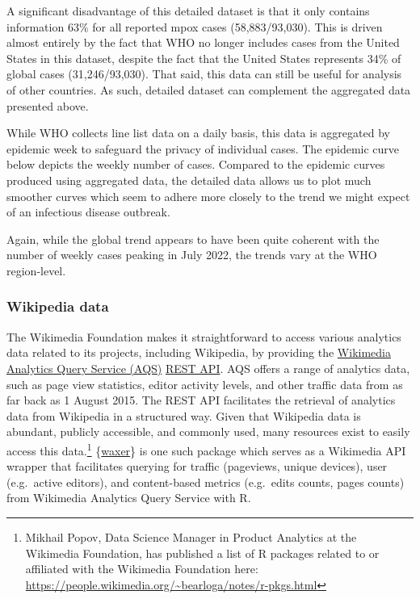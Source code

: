 \documentclass[
  12pt,
]{article}
\begin{document}
A significant disadvantage of this detailed dataset is that it only
contains information 63\% for all reported mpox cases (58,883/93,030).
This is driven almost entirely by the fact that WHO no longer includes
cases from the United States in this dataset, despite the fact that the
United States represents 34\% of global cases (31,246/93,030). That
said, this data can still be useful for analysis of other countries. As
such, detailed dataset can complement the aggregated data presented
above.

While WHO collects line list data on a daily basis, this data is
aggregated by epidemic week to safeguard the privacy of individual
cases. The epidemic curve below depicts the weekly number of cases.
Compared to the epidemic curves produced using aggregated data, the
detailed data allows us to plot much smoother curves which seem to
adhere more closely to the trend we might expect of an infectious
disease outbreak.

Again, while the global trend appears to have been quite coherent with
the number of weekly cases peaking in July 2022, the trends vary at the
WHO region-level.

\subsubsection{Wikipedia data}\label{wikipedia-data}

The Wikimedia Foundation makes it straightforward to access various
analytics data related to its projects, including Wikipedia, by
providing the
\href{https://wikitech.wikimedia.org/wiki/Data_Engineering/Systems/AQS}{Wikimedia
Analytics Query Service (AQS)}
\href{https://wikimedia.org/api/rest_v1/}{REST API}. AQS offers a range
of analytics data, such as page view statistics, editor activity levels,
and other traffic data from as far back as 1 August 2015. The REST API
facilitates the retrieval of analytics data from Wikipedia in a
structured way. Given that Wikipedia data is abundant, publicly
accessible, and commonly used, many resources exist to easily access
this data.\footnote{Mikhail Popov, Data Science Manager in Product
  Analytics at the Wikimedia Foundation, has published a list of R
  packages related to or affiliated with the Wikimedia Foundation here:
  \url{https://people.wikimedia.org/~bearloga/notes/r-pkgs.html}}
\{\href{https://wikimedia.github.io/waxer/}{waxer}\} is one such package
which serves as a Wikimedia API wrapper that facilitates querying for
traffic (pageviews, unique devices), user (e.g.~active editors), and
content-based metrics (e.g.~edits counts, pages counts) from Wikimedia
Analytics Query Service with R.
\end{document}
